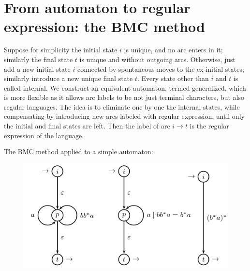 \section{From automaton to regular expression: the BMC method}

Suppose for simplicity the initial state $i$ is unique, and no arc enters in it; similarly the final state $t$ is unique and without outgoing arcs. Otherwise, just add
a new initial state $i$ connected by spontaneous moves to the ex-initial states; similarly introduce a new unique final state $t$. Every state other than $i$ and $t$ is 
called internal. We construct an equivalent automaton, termed generalized,  which is more flexible as it allows arc labels to be not just terminal characters, but also 
regular languages. The idea is to eliminate one by one the internal states, while compensating by introducing new arcs labeled with regular expression, until only the initial and final 
states are left. Then the label of arc $i \rightarrow t$ is the regular expression of the language.
\begin{example}
    The BMC method applied to a simple automaton: 
    \begin{figure}[H]
        \centering
        \includegraphics[width=0.6\linewidth]{images/brzozowski.png}
    \end{figure}
\end{example}